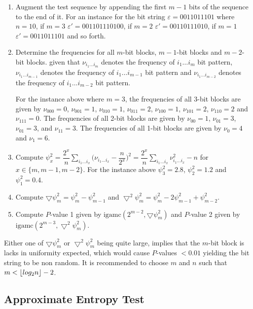 \begin{enumerate}
    \item Augment the test sequence by appending the first $m-1$ bits of the sequence to the end of it. For an instance for the bit string $\varepsilon=0011011101$ where $n=10$, if $m=3$ $\varepsilon'=001101110100$, if $m=2$ $\varepsilon'=00110111010$, if $m=1$ $\varepsilon'=0011011101$ and so forth.
    
    \item Determine the frequencies for all $m$-bit blocks, $m-1$-bit blocks and $m-2$-bit blocks. given that $\nu_{i_1 \ldots i_m}$ denotes the frequency of $i_1 \ldots i_m$ bit pattern, $\nu_{i_1 \ldots i_{m-1}}$ denotes the frequency of $i_1 \ldots i_{m-1}$ bit pattern and $\nu_{i_1 \ldots i_{m-2}}$ denotes the frequency of $i_1 \ldots i_{m-2}$ bit pattern.
    
    For the instance above where $m=3$, the frequencies of all 3-bit blocks are given by $\nu_{000}=0$, $\nu_{001}=1$, $\nu_{010}=1$, $\nu_{011}=2$, $\nu_{100}=1$, $\nu_{101}=2$, $\nu_{110}=2$ and $\nu_{111}=0$. The frequencies of all 2-bit blocks are given by $\nu_{00}=1$, $\nu_{01}=3$, $\nu_{01}=3$, and $\nu_{11}=3$. The frequencies of all 1-bit blocks are given by $\nu_{0}=4$ and $\nu_{1}=6$.
    
    \item Compute $\psi^2_x=\dfrac{2^x}{n}\sum_{i_1 \ldots i_x} \bigg( \nu_{i_1 \ldots i_x} - \dfrac{n}{2^x} \bigg) ^2 = \dfrac{2^x}{n}\sum_{i_1 \ldots i_x}\nu^2_{i_1 \ldots i_x} - n$ for $x \in \{m, m-1, m-2\}$. For the instance above $\psi^2_3=2.8$, $\psi^2_2=1.2$ and $\psi^2_1=0.4$.
    
    \item Compute $\bigtriangledown\psi^2_m=\psi^2_m-\psi^2_{m-1}$ and $\bigtriangledown^2\psi^2_m=\psi^2_m-2\psi^2_{m-1}+\psi^2_{m-2}$.
    
    \item Compute $P$-value 1 given by $\text{igamc}(2^{m-2}, \bigtriangledown\psi^2_m)$ and $P$-value 2 given by $\text{igamc}(2^{m-3}, \bigtriangledown^2\psi^2_m)$.
\end{enumerate}

Either one of $\bigtriangledown\psi^2_m$ or $\bigtriangledown^2\psi^2_m$ being quite large, implies that the $m$-bit block is lacks in uniformity expected, which would cause $P$-values $<0.01$ yielding the bit string to be non random. It is recommended to choose $m$ and $n$ such that $m < \floor*{log_2n}-2$.

\subsection{Approximate Entropy Test}

